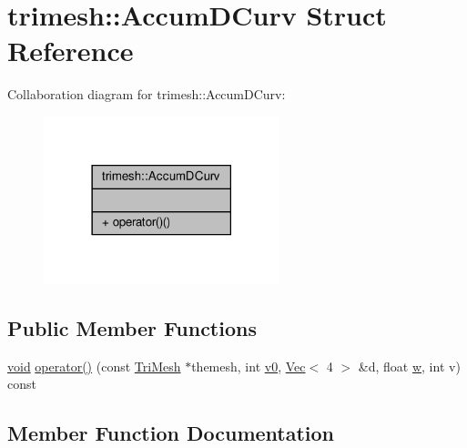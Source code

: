 \hypertarget{structtrimesh_1_1AccumDCurv}{}\section{trimesh\+:\+:Accum\+D\+Curv Struct Reference}
\label{structtrimesh_1_1AccumDCurv}


Collaboration diagram for trimesh\+:\+:Accum\+D\+Curv\+:\nopagebreak
\begin{figure}[H]
\begin{center}
\leavevmode
\includegraphics[width=194pt]{d3/d97/structtrimesh_1_1AccumDCurv__coll__graph}
\end{center}
\end{figure}
\subsection*{Public Member Functions}
\begin{DoxyCompactItemize}
\item 
\hyperlink{namespacetrimesh_a784ddfd979e1c579bda795a8edfc3f43}{void} \hyperlink{structtrimesh_1_1AccumDCurv_a204e32323030c88a086ab31b03add777}{operator()} (const \hyperlink{classtrimesh_1_1TriMesh}{Tri\+Mesh} $\ast$themesh, int \hyperlink{namespacetrimesh_a240b3c8ea9cf01bd707862b32fa26dff}{v0}, \hyperlink{classtrimesh_1_1Vec}{Vec}$<$ 4 $>$ \&d, float \hyperlink{namespacetrimesh_acd577db8a2f95fe39ececb95e98a6c71}{w}, int v) const
\end{DoxyCompactItemize}


\subsection{Member Function Documentation}
\mbox{\label{structtrimesh_1_1AccumDCurv_a204e32323030c88a086ab31b03add777}} 
